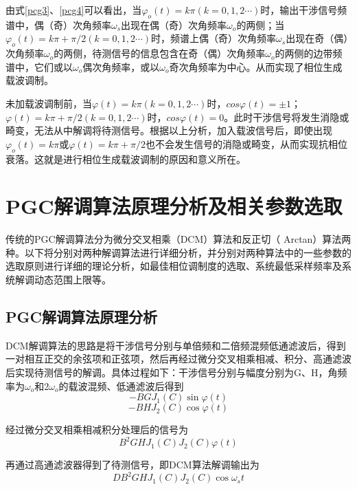 由式\ref{pcg3}、\ref{pcg4}可以看出，当$\varphi_o(t)=k\pi(k=0,1,2\cdots)$时，输出干涉信号频谱中，偶（奇）次角频率$\omega_s$出现在偶（奇）次角频率$\omega_o$的两侧；当$\varphi_o(t)=k\pi+\pi/2(k=0,1,2\cdots)$时，频谱上偶（奇）次角频率$\omega_s$出现在奇（偶）次角频率$\omega_o$的两侧，待测信号的信息包含在奇（偶）次角频率$\omega_o$的两侧的边带频谱中，它们或以$\omega_o$偶次角频率，或以$\omega_o$奇次角频率为中心。从而实现了相位生成载波调制。\par
未加载波调制前，当$\varphi(t)=k\pi(k=0,1,2\cdots)$时，$cos\varphi(t)=±1$；$\varphi(t)=k\pi+\pi/2(k=0,1,2\cdots)$时，$cos\varphi(t)=0$。此时干涉信号将发生消隐或畸变，无法从中解调将待测信号。根据以上分析，加入载波信号后，即使出现$\varphi_o(t)=k\pi$或$\varphi(t)=k\pi+\pi/2$也不会发生信号的消隐或畸变，从而实现抗相位衰落。这就是进行相位生成载波调制的原因和意义所在。
\section{PGC解调算法原理分析及相关参数选取}
传统的PGC解调算法分为微分交叉相乘（DCM）算法和反正切（ Arctan）算法两种。以下将分别对两种解调算法进行详细分析，并分别对两种算法中的一些参数的选取原则进行详细的理论分析，如最佳相位调制度的选取、系统最低采样频率及系统解调动态范围上限等。
\subsection{PGC解调算法原理分析}
DCM解调算法的思路是将干涉信号分别与单倍频和二倍频混频低通滤波后，得到一对相互正交的余弦项和正弦项，然后再经过微分交叉相乘相减、积分、高通滤波后实现待测信号的解调。具体过程如下：干涉信号分别与幅度分别为G、H，角频率为$\omega_o$和$2\omega_o$的载波混频、低通滤波后得到
\begin{equation}
-B G J_{1}(C) \sin \varphi(t)
\label{pcg6}
\end{equation}
\begin{equation}
-B H J_{2}(C) \cos \varphi(t)
\label{pcg7}
\end{equation}\par


经过微分交叉相乘相减积分处理后的信号为
\begin{equation}
B^{2} G H J_{1}(C) J_{2}(C) \varphi(t)
\end{equation}\par


再通过高通滤波器得到了待测信号，即DCM算法解调输出为
\begin{equation}
D B^{2} G H J_{1}(C) J_{2}(C) \cos \omega_{s}t
\end{equation}\par


